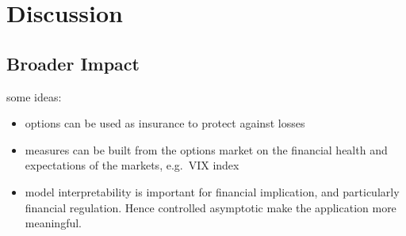 \section{Discussion} \label{sec:discuss}

\subsection{Broader Impact}

 some ideas:
\begin{itemize}
\item options can be used as insurance to protect against losses
\item measures can be built from the options market on the financial health and expectations of the markets, e.g.\ VIX index
\item model interpretability is important for financial implication, and particularly financial regulation. Hence controlled asymptotic make the application more meaningful.
\end{itemize}

%
%
%
%
%

